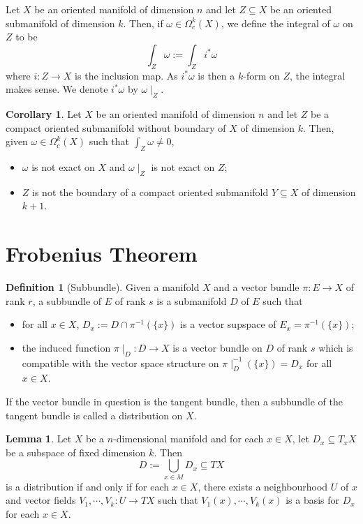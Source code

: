 \documentclass[]{article}
\theoremstyle{definition}
\newtheorem{corollary}{Corollary}[theorem]
\theoremstyle{definition}
\newtheorem{definition}{Definition}[section]
\newtheorem{lemma}{Lemma}[section]
\begin{document}
Let \(X\) be an oriented manifold of dimension \(n\) and let \(Z \subseteq X\) 
be an oriented submanifold of dimension \(k\). Then, if 
\(\omega \in \Omega^k_c(X)\), we define the integral of \(\omega\) on \(Z\) to be 
\[\int_Z \omega := \int_Z i^* \omega\]
where \(i : Z \to X\) is the inclusion map. As \(i^* \omega\) is then a 
\(k\)-form on \(Z\), the integral makes sense. We denote \(i^* \omega\) by 
\(\omega\mid_Z\).

\begin{corollary}
  Let \(X\) be an oriented manifold of dimension \(n\) and let \(Z\) be a 
  compact oriented submanifold without boundary of \(X\) of dimension \(k\). 
  Then, given \(\omega \in \Omega_c^k(X)\) such that \(\int_Z \omega \neq 0\), 
  \begin{itemize}
    \item \(\omega\) is not exact on \(X\) and \(\omega\mid_Z\) is not exact on \(Z\);
    \item \(Z\) is not the boundary of a compact oriented submanifold \(Y \subseteq X\) 
     of dimension \(k + 1\).
  \end{itemize}
\end{corollary}

\newpage
\section{Frobenius Theorem}

\begin{definition}[Subbundle]
  Given a manifold \(X\) and a vector bundle \(\pi : E \to X\) of rank \(r\), a 
  subbundle of \(E\) of rank \(s\) is a submanifold \(D\) of \(E\) such that 
  \begin{itemize}
    \item for all \(x \in X\), \(D_x := D \cap \pi^{-1}(\{x\})\) is a vector 
      supspace of \(E_x = \pi^{-1}(\{x\})\);
    \item the induced function \(\pi\mid_D : D \to X\) is a vector bundle on 
      \(D\) of rank \(s\) which is compatible with the vector space structure 
      on \(\pi\mid_D^{-1}(\{x\}) = D_x\) for all \(x \in X\).
  \end{itemize}
  If the vector bundle in question is the tangent bundle, then a subbundle of the 
  tangent bundle is called a distribution on \(X\).
\end{definition}

\begin{lemma}
  Let \(X\) be a \(n\)-dimensional manifold and for each \(x \in X\), let \(D_x \subseteq T_x X\) 
  be a subspace of fixed dimension \(k\). Then 
  \[D := \bigcup_{x \in M}D_x \subseteq TX\]
  is a distribution if and only if for each \(x \in X\), there exists a neighbourhood 
  \(U\) of \(x\) and vector fields \(V_1, \cdots, V_k : U \to TX\) such that 
  \(V_1(x), \cdots, V_k(x)\) is a basis for \(D_x\) for each \(x \in X\).
\end{lemma}
\end{document}
